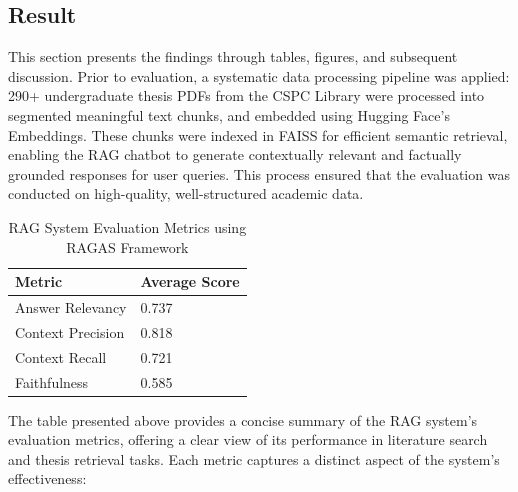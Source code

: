 \begin{refsection}
\section{Result}
This section presents the findings through tables, figures, and subsequent discussion. Prior to evaluation, a systematic data processing pipeline was applied: 290+ undergraduate thesis PDFs from the CSPC Library were processed into segmented meaningful text chunks, and embedded using Hugging Face's Embeddings. These chunks were indexed in FAISS for efficient semantic retrieval, enabling the RAG chatbot to generate contextually relevant and factually grounded responses for user queries. This process ensured that the evaluation was conducted on high-quality, well-structured academic data.

\begin{table}[H]
    \centering
    \caption{RAG System Evaluation Metrics using RAGAS Framework}
    \label{tab:rag_metrics}
    \begin{tabular}{ll} 
        \hline
        \textbf{Metric}     & \textbf{Average Score} \\
        \hline
        Answer Relevancy    & 0.737 \\
        Context Precision   & 0.818 \\
        Context Recall      & 0.721 \\
        Faithfulness        & 0.585 \\
        \hline
    \end{tabular}
\end{table}

The table presented above provides a concise summary of the RAG system’s evaluation metrics, offering a clear view of its performance in literature search and thesis retrieval tasks. Each metric captures a distinct aspect of the system’s effectiveness:


\end{refsection}
